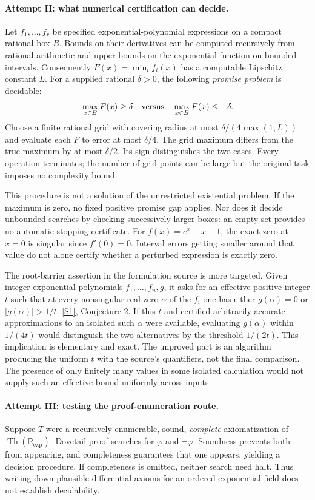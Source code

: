 \documentclass[11pt,a4paper]{article}
\newcommand{\R}{\mathbb{R}}
\newcommand{\sref}[2]{\hyperlink{source:#1:#2}{[S#2]}}
\numberwithin{equation}{section}
\begin{document}
\paragraph{Attempt II: what numerical certification can decide.}
Let $f_1,\ldots,f_r$ be specified exponential-polynomial expressions on
a compact rational box $B$.  Bounds on their derivatives can be
computed recursively from rational arithmetic and upper bounds on the
exponential function on bounded intervals.  Consequently
$F(x)=\min_i f_i(x)$ has a computable Lipschitz constant $L$.
For a supplied rational $\delta>0$, the following \emph{promise problem}
is decidable:
\[
 \max_{x\in B}F(x)\geq\delta
 \quad\hbox{versus}\quad
 \max_{x\in B}F(x)\leq-\delta.
\]
Choose a finite rational grid with covering radius at most
$\delta/(4\max(1,L))$ and evaluate each $F$ to error at most
$\delta/4$.  The grid maximum differs from the true maximum by at
most $\delta/2$.  Its sign distinguishes the two cases.  Every
operation terminates; the number of grid points can be large but the
original task imposes no complexity bound.

This procedure is not a solution of the unrestricted existential
problem.  If the maximum is zero, no fixed positive promise gap applies.
Nor does it decide unbounded searches by checking successively larger
boxes: an empty set provides no automatic stopping certificate.
For $f(x)=e^x-x-1$, the exact zero at $x=0$ is singular since $f'(0)=0$.
Interval errors getting smaller around that value do not alone certify
whether a perturbed expression is exactly zero.

The root-barrier assertion in the formulation source is more targeted.
Given integer exponential polynomials $f_1,\ldots,f_n,g$, it asks for
an effective positive integer $t$ such that at every nonsingular real
zero $\alpha$ of the $f_i$ one has either $g(\alpha)=0$ or
$|g(\alpha)|>1/t$. \sref{statement}{1}, Conjecture 2.
If this $t$ and certified arbitrarily accurate approximations to an
isolated such $\alpha$ were available, evaluating $g(\alpha)$ within
$1/(4t)$ would distinguish the two alternatives by the threshold
$1/(2t)$.  This implication is elementary and exact.  The unproved
part is an algorithm producing the uniform $t$ with the source's
quantifiers, not the final comparison.  The presence of only finitely
many values in some isolated calculation would not supply such an
effective bound uniformly across inputs.

\paragraph{Attempt III: testing the proof-enumeration route.}
Suppose $T$ were a recursively enumerable, sound, \emph{complete}
axiomatization of $\operatorname{Th}(\R_{\exp})$.  Dovetail proof
searches for $\varphi$ and $\neg\varphi$.  Soundness prevents both from
appearing, and completeness guarantees that one appears, yielding a
decision procedure.  If completeness is omitted, neither search need
halt.  Thus writing down plausible differential axioms for an ordered
exponential field does not establish decidability.
\end{document}
